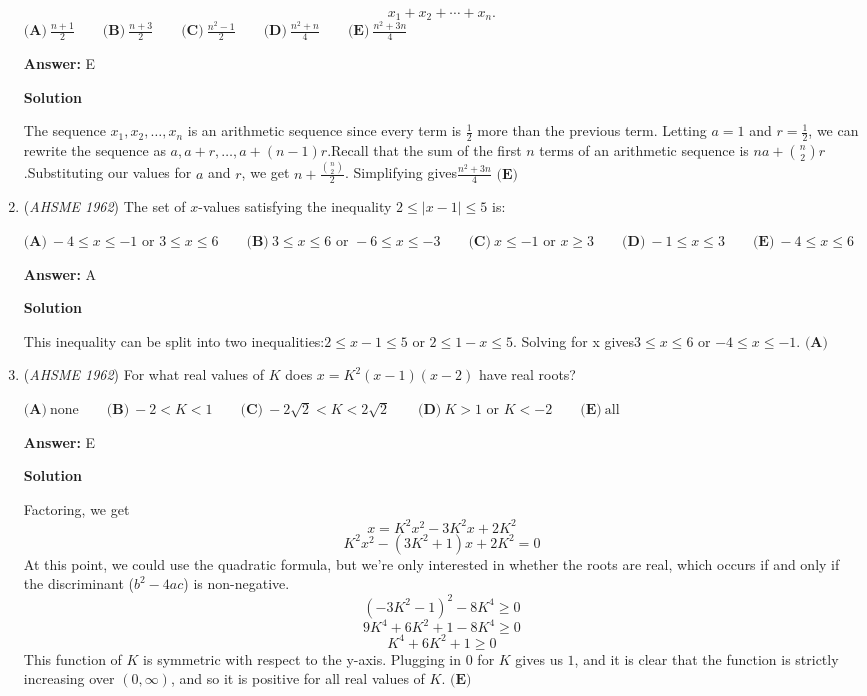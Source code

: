 \begin{enumerate}
 \[x_1 + x_2 + \cdots + x_n.\]
$\textbf{(A)}\ \frac{n+1}{2} \qquad  \textbf{(B)}\ \frac{n+3}{2} \qquad  \textbf{(C)}\ \frac{n^2-1}{2} \qquad  \textbf{(D)}\ \frac{n^2+n}{4} \qquad  \textbf{(E)}\ \frac{n^2+3n}{4}$

 \textbf{Answer: }E



\textbf{Solution}

The sequence $x_1, x_2, \dots, x_n$ is an arithmetic sequence since every term is $\frac12$ more than the previous term. Letting $a=1$ and $r=\frac12$, we can rewrite the sequence as $a, a+r, \dots, a+(n-1)r$.Recall that the sum of the first $n$ terms of an arithmetic sequence is $na+\binom{n}2r$.Substituting our values for $a$ and $r$, we get $n+\frac{\binom{n}2}{2}$. Simplifying gives$\boxed{\frac{n^2+3n}{4}\textbf{ (E)}}$



	\item (\textit{AHSME 1962}) The set of $x$-values satisfying the inequality $2 \leq |x - 1| \leq 5$ is:


 $\textbf{(A)}\ -4 \leq x \leq -1 \text{ or } 3 \leq x \leq 6 \qquad  \textbf{(B)}\ 3 \leq x \leq 6 \text{ or } -6 \leq x \leq -3 \qquad  \textbf{(C)}\ x \leq -1 \text{ or } x \geq 3 \qquad  \textbf{(D)}\ -1 \leq x \leq 3 \qquad  \textbf{(E)}\ -4 \leq x \leq 6$

 \textbf{Answer: }A



\textbf{Solution}

This inequality can be split into two inequalities:$2\le x-1\le5$ or $2\le1-x\le5$. Solving for x gives$3\le x\le6$ or $-4\le x\le-1$. $\boxed{\textbf{(A)}}$



	\item (\textit{AHSME 1962}) For what real values of $K$ does $x = K^2(x - 1)(x - 2)$ have real roots?


 $\textbf{(A)}\ \text{none} \qquad  \textbf{(B)}\ -2 < K < 1 \qquad  \textbf{(C)}\ -2\sqrt{2} < K < 2\sqrt{2} \qquad  \textbf{(D)}\ K > 1 \text{ or } K < -2 \qquad  \textbf{(E)}\ \text{all}$

 \textbf{Answer: }E



\textbf{Solution}

Factoring, we get
 \[x = K^2x^2 - 3K^2x + 2K^2\]
 \[K^2x^2 - (3K^2+1)x + 2K^2 = 0\]At this point, we could use the quadratic formula, but we're only interested in whether the roots are real, which occurs if and only if the discriminant ($b^2-4ac$) is non-negative.
 \[(-3K^2-1)^2-8K^4\ge0\]
 \[9K^4+6K^2+1-8K^4\ge0\]
 \[K^4+6K^2+1\ge0\]This function of $K$ is symmetric with respect to the y-axis. Plugging in $0$ for $K$ gives us $1$, and it is clear that the function is strictly increasing over $(0,\infty)$, and so it is positive for all real values of $K$. $\boxed{\textbf{(E)}}$




\end{enumerate}
